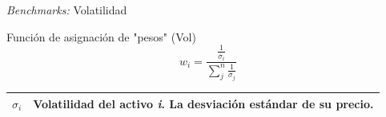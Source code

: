 \documentclass[aspectratio=169,xcolor=dvipsnames]{beamer}
\begin{document}
\begin{frame}{\textit{Benchmarks: }Volatilidad}
    \begin{block}{Función de asignación de "pesos" (Vol)}
        \begin{equation}
            w_{i} = \frac{\frac{1}{\sigma_{i}}}{\sum_{j}^{n}\frac{1}{\sigma_{j}}}   \tag{5}
        \end{equation}
    \end{block}
    \begin{tabularx}{\textwidth}{@{}
        >{\raggedright\arraybackslash}p{}
        >{\raggedright\arraybackslash}X@{}}
        \toprule
        $\sigma_i$ & Volatilidad del activo \emph{i}. La desviación estándar de su precio. \\
        \bottomrule
    \end{tabularx}
\end{frame}
\end{document}
